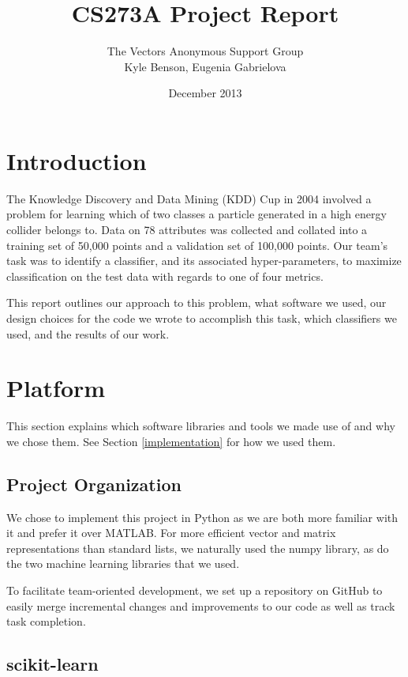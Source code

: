 \documentclass{article}
\title{CS273A Project Report}
\author{The Vectors Anonymous Support Group\\Kyle Benson, Eugenia Gabrielova}
\date{December 2013}
\begin{document}
\maketitle

\section{Introduction}

The Knowledge Discovery and Data Mining (KDD) Cup in 2004 involved a problem for learning which of two classes a particle generated in a high energy collider belongs to.
Data on 78 attributes was collected and collated into a training set of 50,000 points and a validation set of 100,000 points.
Our team's task was to identify a classifier, and its associated hyper-parameters, to maximize classification on the test data with regards to one of four metrics.

This report outlines our approach to this problem, what software we used, our design choices for the code we wrote to accomplish this task, which classifiers we used, and the results of our work.



\section{Platform}

This section explains which software libraries and tools we made use of and why we chose them.
See Section \ref{implementation} for how we used them.

\subsection{Project Organization}
We chose to implement this project in Python as we are both more familiar with it and prefer it over MATLAB\textregistered.
For more efficient vector and matrix representations than standard lists, we naturally used the numpy library, as do the two machine learning libraries that we used.

To facilitate team-oriented development, we set up a repository on GitHub to easily merge incremental changes and improvements to our code as well as track task completion.

\subsection{scikit-learn}
\end{document}
